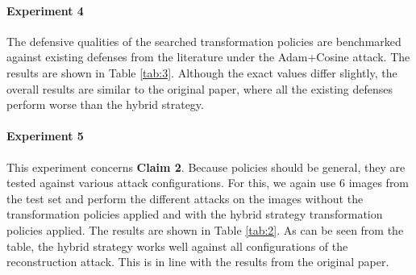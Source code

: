\paragraph{Experiment 4} The defensive qualities of the searched transformation policies are benchmarked against existing defenses from the literature \cite{zhu2019} \cite{wei2020} under the Adam+Cosine attack. The results are shown in Table \ref{tab:3}. Although the exact values differ slightly, the overall results are similar to the original paper, where all the existing defenses perform worse than the hybrid strategy.

\paragraph{Experiment 5} This experiment concerns \textbf{Claim 2}. Because policies should be general, they are tested against various attack configurations. For this, we again use $6$ images from the test set and perform the different attacks on the images without the transformation policies applied and with the hybrid strategy transformation policies applied. The results are shown in Table \ref{tab:2}. As can be seen from the table, the hybrid strategy works well against all configurations of the reconstruction attack. This is in line with the results from the original paper.

